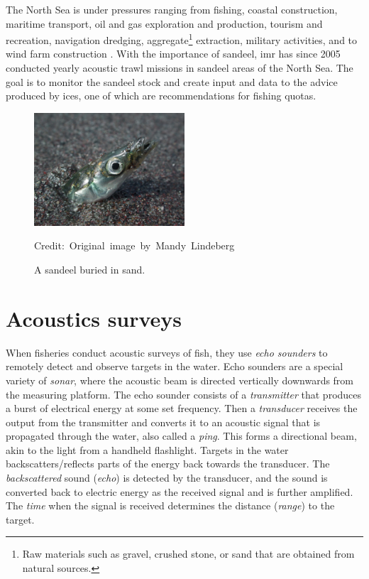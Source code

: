     The North Sea is under pressures ranging from fishing, coastal construction, maritime transport, oil and gas exploration and production, tourism and recreation, navigation dredging, aggregate\footnote{Raw materials such as gravel, crushed stone, or sand that are obtained from natural sources.} extraction, military activities, and to wind farm construction \cite{ICES2021}. With the importance of sandeel, \gls{imr} has since 2005 conducted yearly acoustic trawl missions in sandeel areas of the North Sea\cite{johnsen2017collective}. The goal is to monitor the sandeel stock and create input and data to the advice produced by \gls{ices}, one of which are recommendations for fishing quotas\cite{sizedependentfreqrespons2009johnsen}. 
    
    \begin{figure}[H]
        \centering

        \includegraphics[width=0.5\textwidth]{figures/Ammodytes_hexapterus.jpg} 

        \caption[Sandeel]{A sandeel buried in sand.}
        \medskip 
        \hspace*{15pt}\hbox{\scriptsize Credit: Original image by Mandy Lindeberg\cite{sandeel_image}}
        \label{sandeel_image}
    \end{figure}



    
\section{Acoustics surveys}\label{acoustics}
    When fisheries conduct acoustic surveys of fish, they use \textit{echo sounders} to remotely detect and observe targets in the water. Echo sounders are a special variety of \textit{sonar}, where the acoustic beam is directed vertically downwards from the measuring platform. The echo sounder consists of a \textit{transmitter} that produces a burst of electrical energy at some set frequency. Then a \textit{transducer} receives the output from the transmitter and converts it to an acoustic signal that is propagated through the water, also called a \textit{ping}. This forms a directional beam, akin to the light from a handheld flashlight. Targets in the water backscatters/reflects parts of the energy back towards the transducer. The \textit{backscattered} sound (\textit{echo}) is detected by the transducer, and the sound is converted back to electric energy as the received signal and is further amplified. The \textit{time} when the signal is received determines the distance (\textit{range}) to the target\cite{simmonds2008fisheries}.
    
